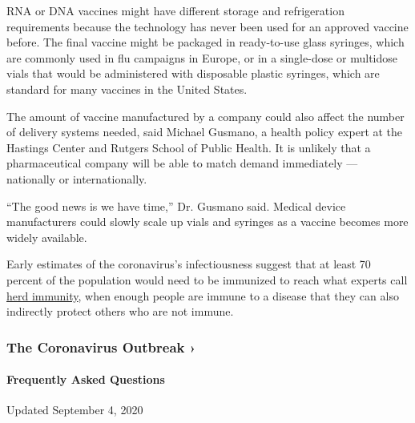 RNA or DNA vaccines might have different storage and refrigeration
requirements because the technology has never been used for an approved
vaccine before. The final vaccine might be packaged in ready-to-use
glass syringes, which are commonly used in flu campaigns in Europe, or
in a single-dose or multidose vials that would be administered with
disposable plastic syringes, which are standard for many vaccines in the
United States.

The amount of vaccine manufactured by a company could also affect the
number of delivery systems needed, said Michael Gusmano, a health policy
expert at the Hastings Center and Rutgers School of Public Health. It is
unlikely that a pharmaceutical company will be able to match demand
immediately --- nationally or internationally.

``The good news is we have time,'' Dr. Gusmano said. Medical device
manufacturers could slowly scale up vials and syringes as a vaccine
becomes more widely available.

Early estimates of the coronavirus's infectiousness suggest that at
least 70 percent of the population would need to be immunized to reach
what experts call
\href{https://www.nytimes3xbfgragh.onion/2020/04/10/health/coronavirus-antibody-test.html}{herd
immunity}, when enough people are immune to a disease that they can also
indirectly protect others who are not immune.

\href{https://www.nytimes3xbfgragh.onion/news-event/coronavirus?action=click\&pgtype=Article\&state=default\&region=MAIN_CONTENT_3\&context=storylines_faq}{}

\hypertarget{the-coronavirus-outbreak-}{%
\subsubsection{The Coronavirus Outbreak
›}\label{the-coronavirus-outbreak-}}

\hypertarget{frequently-asked-questions}{%
\paragraph{Frequently Asked
Questions}\label{frequently-asked-questions}}

Updated September 4, 2020

